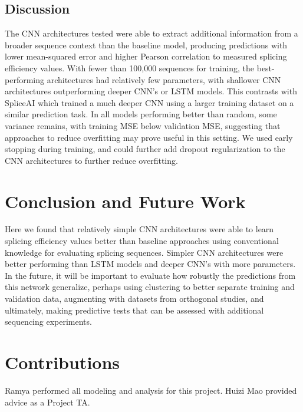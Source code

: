 \documentclass{article}
\begin{document}
\subsection{Discussion} 
The CNN architectures tested were able to extract additional information from a broader sequence context than the baseline model, producing predictions with lower mean-squared error and higher Pearson correlation to measured splicing efficiency values. With fewer than 100,000 sequences for training, the best-performing architectures had relatively few parameters, with shallower CNN architectures outperforming deeper CNN's or LSTM models. This contrasts with SpliceAI \cite{spliceai} which trained a much deeper CNN using a larger training dataset on a similar prediction task. In all models performing better than random, some variance remains, with training MSE below validation MSE, suggesting that approaches to reduce overfitting may prove useful in this setting. We used early stopping during training, and could further add dropout regularization to the CNN architectures to further reduce overfitting. 

\section{Conclusion and Future Work }
Here we found that relatively simple CNN architectures were able to learn splicing efficiency values better than baseline approaches using conventional knowledge for evaluating splicing sequences. Simpler CNN architectures were better performing than LSTM models and deeper CNN's with more parameters. In the future, it will be important to evaluate how robustly the predictions from this network generalize, perhaps using clustering to better separate training and validation data, augmenting with datasets from orthogonal studies, and ultimately, making predictive tests that can be assessed with additional sequencing experiments.

\section{Contributions}
Ramya performed all modeling and analysis for this project. Huizi Mao provided advice as a Project TA. 
\end{document}
